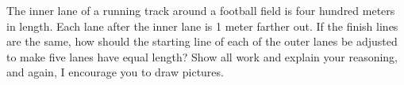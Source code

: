 \documentclass[noauthor,hints,nooutcomes,handout,12pt]{ximera}
\begin{document}
\begin{question}
\end{question}

\mynewpage


\begin{question}
  The inner lane of a running track around a football field is four
  hundred meters in length.  Each lane after the inner lane is 1 meter
  farther out.  If the finish lines are the same, how should the
  starting line of each of the outer lanes be adjusted to make five
  lanes have equal length? Show all work and explain your reasoning,
  and again, I encourage you to draw pictures.
\end{question}
\end{document}
